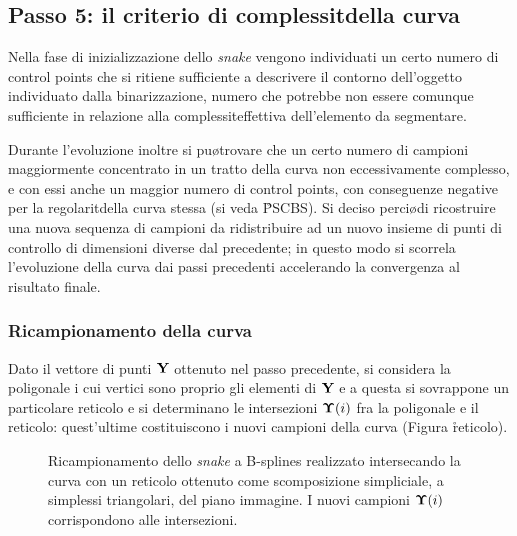 \subsection{Passo 5: il criterio di complessit\a della curva}

Nella fase di inizializzazione dello {\it snake} vengono individuati un certo numero di control
points che si ritiene sufficiente a descrivere il contorno dell'oggetto individuato dalla
binarizzazione, numero che potrebbe non essere comunque sufficiente in relazione alla
complessit\a effettiva dell'elemento da segmentare.

Durante l'evoluzione inoltre si pu\o trovare che un certo numero di campioni \e maggiormente
concentrato in un tratto della curva non eccessivamente complesso, e con essi anche un
maggior numero di control points, con conseguenze negative per la regolarit\a della curva
stessa (si veda \r{PSCBS}).
Si \e deciso perci\o di ricostruire una nuova sequenza di campioni da ridistribuire ad un
nuovo insieme di punti di controllo di dimensioni diverse dal precedente; in questo modo
si scorrela l'evoluzione della curva dai passi precedenti accelerando la convergenza al
risultato finale.

\subsubsection{Ricampionamento della curva}

Dato il vettore di punti ${\bf Y}$ ottenuto nel passo precedente, si considera la poligonale
i cui vertici sono proprio gli elementi di ${\bf Y}$ e a questa si sovrappone un particolare
reticolo e si determinano le intersezioni ${\bf \Upsilon}(i)$ fra la poligonale e il reticolo:
quest'ultime costituiscono i nuovi campioni della curva (Figura \r{reticolo}).

\begin{figure}[tbp]
 \centerline{
  }
 \caption[Riparametrizzazione dello snake a B-splines]
  {Ricampionamento dello {\it snake} a B-splines realizzato intersecando la curva con un 
   reticolo ottenuto come scomposizione simpliciale, a simplessi triangolari, del piano
   immagine. I nuovi campioni ${\bf \Upsilon}(i)$ corrispondono alle intersezioni.}
\end{figure}

